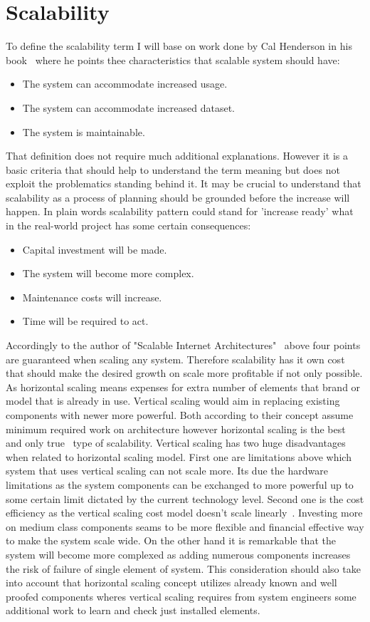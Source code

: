 \section{Scalability}\label{sec:scalability}
To define the scalability term I will base on work done by Cal Henderson in his book~\cite[pages 203--204]{build_scalable} where he points thee characteristics that scalable system should have:
\begin{itemize}
\item{The system can accommodate increased usage.}
\item{The system can accommodate increased dataset.}
\item{The system is maintainable.}
\end{itemize}
That definition does not require much additional explanations. However it is a basic criteria that should help to understand the term meaning but does not exploit the problematics standing behind it. It may be crucial to understand that scalability as a process of planning should be grounded before the increase will happen. In plain words scalability pattern could stand for 'increase ready' what in the real-world project has some certain consequences:
\begin{itemize}
\item{Capital investment will be made.}
\item{The system will become more complex.}
\item{Maintenance costs will increase.}
\item{Time will be required to act.}
\end{itemize}
Accordingly to the author of  "Scalable Internet Architectures"~\cite[page 8]{scalable_arch} above four points are guaranteed when scaling any system. Therefore scalability has it own cost that should make the desired growth on scale more profitable if not only possible. As horizontal scaling means expenses for extra number of elements that brand or model that is already in use. Vertical scaling would aim in replacing existing components with newer more powerful. Both according to their concept assume minimum required work on architecture however horizontal scaling is the best and only true~\cite[page 5]{scalable_arch} type of scalability. Vertical scaling has two huge disadvantages when related to horizontal scaling model. First one are limitations above which system that uses vertical scaling can not scale more. Its due the hardware limitations as the system components can be exchanged to more powerful up to some certain limit dictated by the current technology level. Second one is the cost efficiency as the vertical scaling cost model doesn't scale linearly~\cite[page 204]{build_scalable}. Investing more on medium class components seams to be more flexible and financial effective way to make the system scale wide. On the other hand it is remarkable that the system will become more complexed as adding numerous components increases the risk of failure of single element of system. This consideration should also take into account that horizontal scaling concept utilizes already known and well proofed components wheres vertical scaling requires from system engineers some additional work to learn and check just installed elements.

